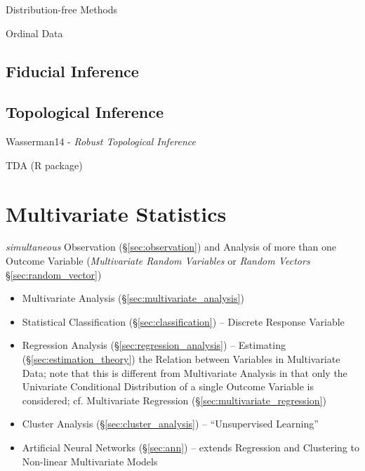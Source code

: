 Distribution-free Methods

Ordinal Data



\subsection{Fiducial Inference}\label{sec:fiducial_inference}

\subsection{Topological Inference}\label{sec:topological_inference}

Wasserman14 - \emph{Robust Topological Inference}

TDA (R package)



\section{Multivariate Statistics}\label{sec:multivariate_statistics}

\emph{simultaneous} Observation (\S\ref{sec:observation}) and Analysis of more
than one Outcome Variable (\emph{Multivariate Random Variables} or \emph{Random
  Vectors} \S\ref{sec:random_vector})

\begin{itemize}
  \item Multivariate Analysis (\S\ref{sec:multivariate_analysis})
  \item Statistical Classification (\S\ref{sec:classification})
    -- Discrete Response Variable
  \item Regression Analysis (\S\ref{sec:regression_analysis}) -- Estimating
    (\S\ref{sec:estimation_theory}) the Relation between Variables in
    Multivariate Data; note that this is different from Multivariate Analysis in
    that only the Univariate Conditional Distribution of a single Outcome
    Variable is considered; cf. Multivariate Regression
    (\S\ref{sec:multivariate_regression})
  \item Cluster Analysis (\S\ref{sec:cluster_analysis}) --
    ``Unsupervised Learning''
  \item Artificial Neural Networks (\S\ref{sec:ann}) -- extends Regression and
    Clustering to Non-linear Multivariate Models
\end{itemize}



